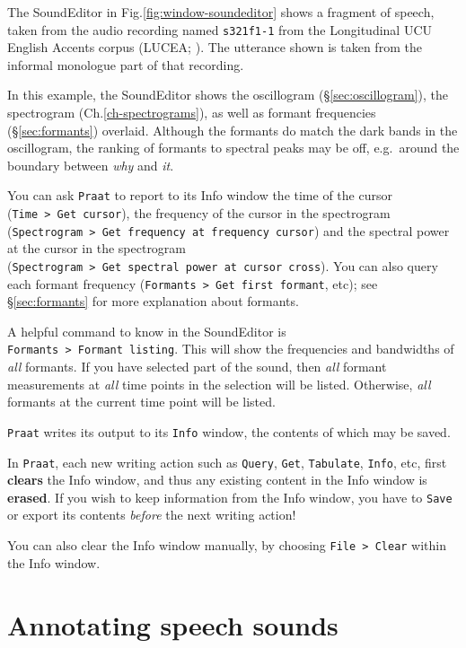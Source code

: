 \documentclass[
]{book}
\begin{document}
\protect{}\label{box-windowsfile-details-again}
The SoundEditor in Fig.\ref{fig:window-soundeditor} shows a fragment of speech, taken from the audio recording named \texttt{s321f1-1} from the Longitudinal UCU English Accents corpus (LUCEA; \citet{Orr_Quené_2017}). The utterance shown is taken from the informal monologue part of that recording.

In this example, the SoundEditor shows the oscillogram (§\ref{sec:oscillogram}), the spectrogram (Ch.\ref{ch-spectrograms}), as well as formant frequencies (§\ref{sec:formants}) overlaid. Although the formants do match the dark bands in the oscillogram, the ranking of formants to spectral peaks may be off, e.g.~around the boundary between \emph{why} and \emph{it}.

You can ask \texttt{Praat} to report to its Info window the time of the cursor (\texttt{Time\ \textgreater{}\ Get\ cursor}), the frequency of the cursor in the spectrogram (\texttt{Spectrogram\ \textgreater{}\ Get\ frequency\ at\ frequency\ cursor}) and the spectral power at the cursor in the spectrogram (\texttt{Spectrogram\ \textgreater{}\ Get\ spectral\ power\ at\ cursor\ cross}). You can also query each formant frequency (\texttt{Formants\ \textgreater{}\ Get\ first\ formant}, etc); see §\ref{sec:formants} for more explanation about formants.

A helpful command to know in the SoundEditor is \texttt{Formants\ \textgreater{}\ Formant\ listing}. This will show the frequencies and bandwidths of \emph{all} formants. If you have selected part of the sound, then \emph{all} formant measurements at \emph{all} time points in the selection will be listed. Otherwise, \emph{all} formants at the current time point will be listed.

\texttt{Praat} writes its output to its \texttt{Info} window, the contents of which may be saved.

\protect{}\label{box:clearinfo}
In \texttt{Praat}, each new writing action such as \texttt{Query}, \texttt{Get}, \texttt{Tabulate}, \texttt{Info}, etc, first \textbf{clears} the Info window, and thus any existing content in the Info window is \textbf{erased}. If you wish to keep information from the Info window, you have to \texttt{Save} or export its contents \emph{before} the next writing action!

You can also clear the Info window manually, by choosing \texttt{File\ \textgreater{}\ Clear} within the Info window.

\chapter{Annotating speech sounds}\label{ch-annotation}
\end{document}
